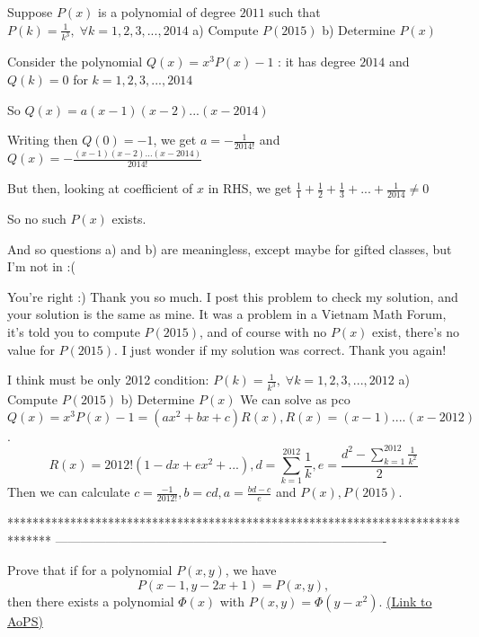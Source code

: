 \begin{solution}
	\begin{tcolorbox}Suppose $P(x)$ is a polynomial of degree $2011$ such that $P(k)=\frac{1}{k^3}, \; \forall k=1,2,3,...,2014$
a) Compute $P(2015)$
b) Determine $P(x)$\end{tcolorbox}
Consider the polynomial $Q(x)=x^3P(x)-1$ : it has degree $2014$ and $Q(k)=0$ for $k=1,2,3,...,2014$

So $Q(x)=a(x-1)(x-2)...(x-2014)$

Writing then $Q(0)=-1$, we get $a=-\frac 1{2014!}$ and $Q(x)=-\frac{(x-1)(x-2)...(x-2014)}{2014!}$

But then, looking at coefficient of $x$ in RHS, we get $\frac 11+\frac 12+\frac 13+...+\frac 1{2014}\ne 0$

So no such $P(x)$ exists.

And so questions a) and b) are meaningless, except maybe for gifted classes, but I'm not in :(
\end{solution}



\begin{solution}
	You're right :)
Thank you so much. I post this problem to check my solution, and your solution is the same as mine.
It was a problem in a Vietnam Math Forum, it's told you to compute $P(2015)$, and of course with no $P(x)$ exist, there's no value for $P(2015)$. I just wonder if my solution was correct.
Thank you again!
\end{solution}



\begin{solution}
	I think must be only 2012 condition:
$P(k)=\frac{1}{k^3}, \; \forall k=1,2,3,...,2012$
a) Compute $P(2015)$
b) Determine $P(x)$
We can solve as pco
$Q(x)=x^3P(x)-1=(ax^2+bx+c)R(x), R(x)=(x-1)....(x-2012)$.
\[R(x)=2012!(1-dx+ex^2+...), d=\sum_{k=1}^{2012}\frac 1k, e=\frac{d^2-\sum_{k=1}^{2012}\frac{1}{k^2}}{2}\]
Then we can calculate $c=\frac{-1}{2012!},b=cd,a=\frac{bd-c}{e}$ and $P(x),P(2015)$.
\end{solution}
*******************************************************************************
-------------------------------------------------------------------------------

\begin{problem}
	Prove that if for a polynomial $P(x, y)$, we have
\[P(x - 1, y - 2x + 1) = P(x, y),\]
then there exists a polynomial $\Phi(x)$ with $P(x, y) = \Phi(y - x^2).$
	\flushright \href{https://artofproblemsolving.com/community/c6h388987}{(Link to AoPS)}
\end{problem}




